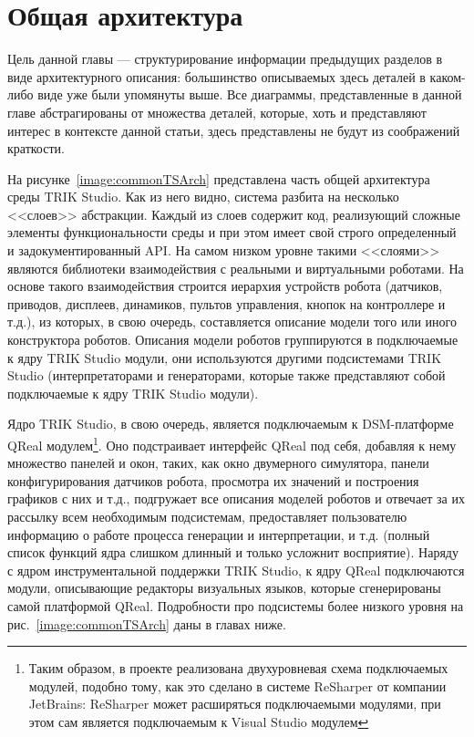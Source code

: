 \documentclass[a5paper]{article}
\begin{document}
\section{Общая архитектура}
\label{chapter:commonArchitecture}

Цель данной главы --- структурирование информации предыдущих разделов в виде архитектурного описания: большинство описываемых здесь деталей в каком-либо виде уже были упомянуты выше. Все диаграммы, представленные в данной главе абстрагированы от множества деталей, которые, хоть и представляют интерес в контексте данной статьи, здесь представлены не будут из соображений краткости.

На рисунке~\ref{image:commonTSArch} представлена часть общей архитектура среды TRIK Studio. Как из него видно, система разбита на несколько <<слоев>> абстракции. Каждый из слоев содержит код, реализующий сложные элементы функциональности среды и при этом имеет свой строго определенный и задокументированный API. На самом низком уровне такими <<слоями>> являются библиотеки взаимодействия с реальными и виртуальными роботами. На основе такого взаимодействия строится иерархия устройств робота (датчиков, приводов, дисплеев, динамиков, пультов управления, кнопок на контроллере и т.д.), из которых, в свою очередь, составляется описание модели того или иного конструктора роботов. Описания модели роботов группируются в подключаемые к ядру TRIK Studio модули, они используются другими подсистемами TRIK Studio (интерпретаторами и генераторами, которые также представляют собой подключаемые к ядру TRIK Studio модули).

Ядро TRIK Studio, в свою очередь, является подключаемым к DSM-платформе QReal модулем\footnote{Таким образом, в проекте реализована двухуровневая схема подключаемых модулей, подобно тому, как это сделано в системе ReSharper от компании JetBrains: ReSharper может расширяться подключаемыми модулями, при этом сам является подключаемым к Visual Studio модулем}. Оно подстраивает интерфейс QReal под себя, добавляя к нему множество панелей и окон, таких, как окно двумерного симулятора, панели конфигурирования датчиков робота, просмотра их значений и построения графиков с них и т.д., подгружает все описания моделей роботов и отвечает за их рассылку всем необходимым подсистемам, предоставляет пользователю информацию о работе процесса генерации и интерпретации, и т.д. (полный список функций ядра слишком длинный и только усложнит восприятие). Наряду с ядром инструментальной поддержки TRIK Studio, к ядру QReal подключаются модули, описывающие редакторы визуальных языков, которые сгенерированы самой платформой QReal. Подробности про подсистемы более низкого уровня на рис.~\ref{image:commonTSArch} даны в главах ниже.
\end{document}
